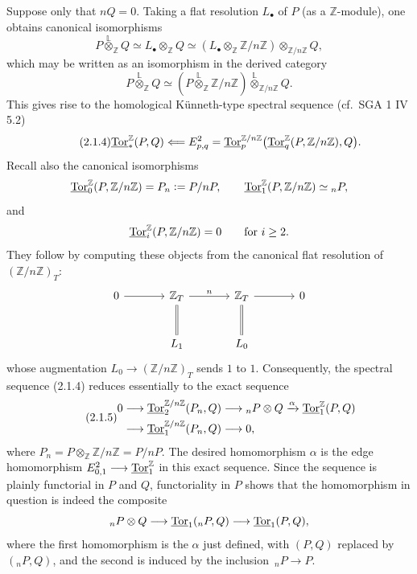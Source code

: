 Suppose only that $nQ=0$.  Taking a flat resolution $L_\bullet$ of
$P$ (as a $\mathbb Z$-module), one obtains canonical isomorphisms
\[
 P\mathbin{\overset{\mathbb L}{\otimes}_{\mathbb Z}}Q
 \simeq L_\bullet\otimes_{\mathbb Z}Q
 \simeq
 (L_\bullet\otimes_{\mathbb Z}\mathbb Z/n\mathbb Z)
 \otimes_{\mathbb Z/n\mathbb Z}Q,
\]
which may be written as an isomorphism in the derived category
\begin{equation}\tag{2.1.3}
 P\mathbin{\overset{\mathbb L}{\otimes}_{\mathbb Z}}Q
 \simeq
 \left(P\mathbin{\overset{\mathbb L}{\otimes}_{\mathbb Z}}
       \mathbb Z/n\mathbb Z\right)
 \mathbin{\overset{\mathbb L}{\otimes}_{\mathbb Z/n\mathbb Z}}Q.
\end{equation}
This gives rise to the homological K\"unneth-type spectral sequence
(cf.\ SGA 1 IV 5.2)
\begin{equation}\tag{2.1.4}
 \uTor^{\mathbb Z}_*(P,Q)
 \Longleftarrow
 E^2_{p,q}
 =
 \uTor^{\mathbb Z/n\mathbb Z}_p
 \bigl(\uTor^{\mathbb Z}_q(P,\mathbb Z/n\mathbb Z),Q\bigr).
\end{equation}
Recall also the canonical isomorphisms
\[
 \uTor^{\mathbb Z}_0(P,\mathbb Z/n\mathbb Z)
 =P_n\mathrel{\mathop:}=P/nP,
 \qquad
 \uTor^{\mathbb Z}_1(P,\mathbb Z/n\mathbb Z)\simeq{}_nP,
\]
and
\[
 \uTor^{\mathbb Z}_i(P,\mathbb Z/n\mathbb Z)=0
 \qquad\text{for }i\geq2.
\]
They follow by computing these objects from the canonical flat
resolution of $(\mathbb Z/n\mathbb Z)_T$:
\[
\begin{tikzcd}[column sep=large,row sep=large]
 0\arrow[r]&
 \mathbb Z_T\arrow[r,"n"]\arrow[d,equal]&
 \mathbb Z_T\arrow[r]\arrow[d,equal]&
 0\\
 &L_1&L_0&
\end{tikzcd}
\]
whose augmentation
$L_0\longrightarrow(\mathbb Z/n\mathbb Z)_T$ sends $1$ to $1$.
Consequently, the spectral sequence (2.1.4) reduces essentially to
the exact sequence
\begin{equation}\tag{2.1.5}
\begin{split}
0\longrightarrow{}&
 \uTor^{\mathbb Z/n\mathbb Z}_2(P_n,Q)
 \longrightarrow{}_nP\otimes Q
 \xrightarrow{\alpha}\uTor^{\mathbb Z}_1(P,Q)\\
\longrightarrow{}&
 \uTor^{\mathbb Z/n\mathbb Z}_1(P_n,Q)
 \longrightarrow0,
\end{split}
\end{equation}
where $P_n=P\otimes_{\mathbb Z}\mathbb Z/n\mathbb Z=P/nP$.
The desired homomorphism $\alpha$ is the edge homomorphism
$E^2_{0,1}\longrightarrow\uTor^{\mathbb Z}_1$ in this exact sequence.
Since the sequence is plainly functorial in $P$ and $Q$, functoriality
in $P$ shows that the homomorphism in question is indeed the composite
\[
 {}_nP\otimes Q
 \longrightarrow\uTor_1({}_nP,Q)
 \longrightarrow\uTor_1(P,Q),
\]
where the first homomorphism is the $\alpha$ just defined, with
$(P,Q)$ replaced by $({}_nP,Q)$, and the second is induced by the
inclusion $\,{}_nP\longrightarrow P$.

